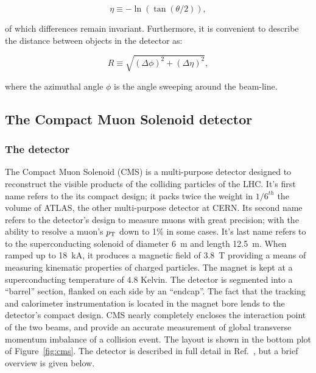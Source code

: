 \begin{equation}
        \eta \equiv −\ln\left( \tan\left(\theta/2\right)\right),
        \label{pseudo}      
\end{equation}

of which differences remain invariant. Furthermore, it is convenient to describe the distance between
objects in the detector as:

\begin{equation}
        R \equiv \sqrt{\left(\Delta\phi\right)^2 + \left(\Delta\eta\right)^2},
        \label{pseudo}      
\end{equation}

where the azimuthal angle $\phi$ is the angle sweeping around the beam-line.

\subsection{The Compact Muon Solenoid detector\label{sec:cms}}

\subsubsection{The detector}
The Compact Muon Solenoid (CMS) is a multi-purpose detector designed to reconstruct
the visible products of the colliding particles of the LHC. It's first name refers to 
the its compact design; it packs twice the weight in $1/6^{th}$ the volume of ATLAS, 
the other multi-purpose detector at CERN. Its second name refers to the detector's design
to measure muons with great precision; with the ability to resolve a muon's $p_{\mathrm{T}}$ down to 
1\% in some cases. It's last name refers to to the superconducting solenoid of diameter 
6~m and length 12.5~m. When ramped up to 18~kA, it produces a magnetic field of 3.8~T providing
a means of measuring kinematic properties of charged particles. The magnet is kept at a 
superconducting temperature of 4.8 Kelvin. The detector is segmented into a ``barrel'' 
section, flanked on each side by an ``endcap''. The fact that the tracking and calorimeter 
instrumentation is located in the magnet bore lends to the detector's compact design. 
CMS nearly completely encloses the interaction point of the two beams, and provide an 
accurate measurement of global transverse momentum imbalance of a collision event. The 
layout is shown in the bottom plot of Figure~\ref{fig:cms}. The detector is described in 
full detail in Ref.~\cite{1748-0221-3-08-S08004,Bayatian:922757,Bayatian:942733}, but a brief
overview is given below. 

